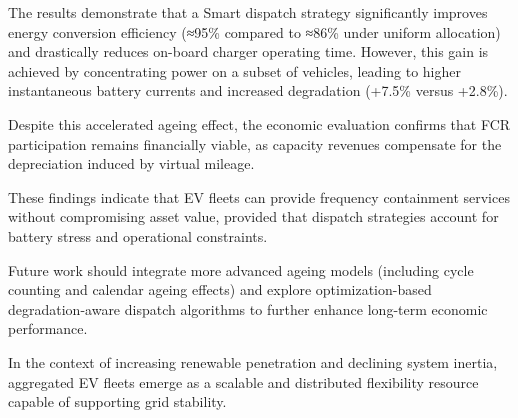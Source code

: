 \documentclass{article}
\begin{document}
The results demonstrate that a Smart dispatch strategy significantly improves energy conversion efficiency (≈95\% compared to ≈86\% under uniform allocation) and drastically reduces on-board charger operating time. However, this gain is achieved by concentrating power on a subset of vehicles, leading to higher instantaneous battery currents and increased degradation (+7.5\% versus +2.8\%).

Despite this accelerated ageing effect, the economic evaluation confirms that FCR participation remains financially viable, as capacity revenues compensate for the depreciation induced by virtual mileage.

These findings indicate that EV fleets can provide frequency containment services without compromising asset value, provided that dispatch strategies account for battery stress and operational constraints.

Future work should integrate more advanced ageing models (including cycle counting and calendar ageing effects) and explore optimization-based degradation-aware dispatch algorithms to further enhance long-term economic performance.

In the context of increasing renewable penetration and declining system inertia, aggregated EV fleets emerge as a scalable and distributed flexibility resource capable of supporting grid stability.
\end{document}
